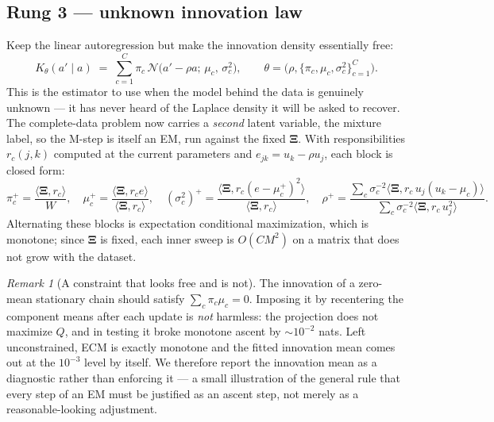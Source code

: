 \documentclass[11pt]{article}
\theoremstyle{remark}
\newtheorem{remark}{Remark}
\newcommand{\Normal}{\mathcal{N}}
\newcommand{\Xibf}{\bm{\Xi}}
\begin{document}
\subsection{Rung 3 --- unknown innovation law}

Keep the linear autoregression but make the innovation density essentially free:
\begin{equation}
  K_\theta(a' \mid a) \;=\; \sum_{c=1}^{C} \pi_c\,
     \Normal\bigl(a' - \rho a;\, \mu_c,\, \sigma_c^2\bigr),
  \qquad
  \theta = \bigl(\rho, \{\pi_c,\mu_c,\sigma^2_c\}_{c=1}^C\bigr).
\end{equation}
This is the estimator to use when the model behind the data is genuinely
unknown --- it has never heard of the Laplace density it will be asked to
recover. The complete-data problem now carries a \emph{second} latent variable,
the mixture label, so the M-step is itself an EM, run against the fixed $\Xibf$.
With responsibilities $r_c(j,k)$ computed at the current parameters and
$e_{jk} = u_k - \rho u_j$, each block is closed form:
\begin{equation}
  \pi_c^{+} = \frac{\langle \Xibf, r_c\rangle}{W},
  \quad
  \mu_c^{+} = \frac{\langle \Xibf, r_c e\rangle}{\langle \Xibf, r_c\rangle},
  \quad
  (\sigma^2_c)^{+} = \frac{\langle \Xibf, r_c (e - \mu^+_c)^2\rangle}{\langle \Xibf, r_c\rangle},
  \quad
  \rho^{+} = \frac{\sum_c \sigma_c^{-2}\langle \Xibf, r_c\, u_j (u_k - \mu_c)\rangle}
                  {\sum_c \sigma_c^{-2}\langle \Xibf, r_c\, u_j^2 \rangle}.
  \label{eq:mix-mstep}
\end{equation}
Alternating these blocks is expectation conditional maximization, which is
monotone; since $\Xibf$ is fixed, each inner sweep is $O(CM^2)$ on a matrix that
does not grow with the dataset.

\begin{remark}[A constraint that looks free and is not]
The innovation of a zero-mean stationary chain should satisfy
$\sum_c \pi_c \mu_c = 0$. Imposing it by recentering the component means after
each update is \emph{not} harmless: the projection does not maximize $Q$, and in
testing it broke monotone ascent by $\sim 10^{-2}$ nats. Left unconstrained, ECM
is exactly monotone and the fitted innovation mean comes out at the $10^{-3}$
level by itself. We therefore report the innovation mean as a diagnostic rather
than enforcing it --- a small illustration of the general rule that every step
of an EM must be justified as an ascent step, not merely as a reasonable-looking
adjustment.
\end{remark}
\end{document}
